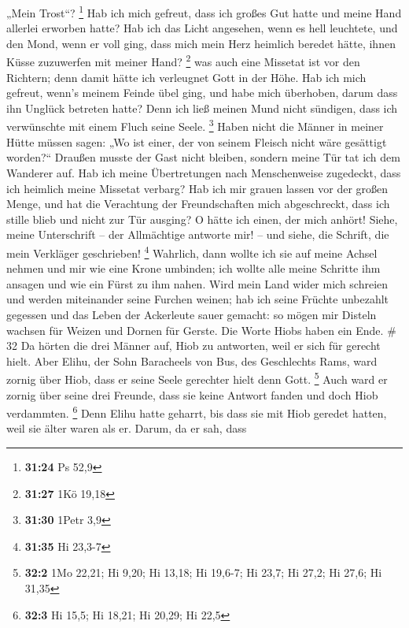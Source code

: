 „Mein Trost``? \footnote{\textbf{31:24} Ps 52,9}  Hab ich
mich gefreut, dass ich großes Gut hatte und meine Hand allerlei erworben
hatte?  Hab ich das Licht angesehen, wenn es hell
leuchtete, und den Mond, wenn er voll ging,  dass mich mein
Herz heimlich beredet hätte, ihnen Küsse zuzuwerfen mit meiner Hand?
\footnote{\textbf{31:27} 1Kö 19,18}  was auch eine Missetat
ist vor den Richtern; denn damit hätte ich verleugnet Gott in der Höhe.
 Hab ich mich gefreut, wenn's meinem Feinde übel ging, und
habe mich überhoben, darum dass ihn Unglück betreten hatte?
 Denn ich ließ meinen Mund nicht sündigen, dass ich
verwünschte mit einem Fluch seine Seele. \footnote{\textbf{31:30} 1Petr
  3,9}  Haben nicht die Männer in meiner Hütte müssen
sagen: „Wo ist einer, der von seinem Fleisch nicht wäre gesättigt
worden?{}``  Draußen musste der Gast nicht bleiben, sondern
meine Tür tat ich dem Wanderer auf.  Hab ich meine
Übertretungen nach Menschenweise zugedeckt, dass ich heimlich meine
Missetat verbarg?  Hab ich mir grauen lassen vor der großen
Menge, und hat die Verachtung der Freundschaften mich abgeschreckt, dass
ich stille blieb und nicht zur Tür ausging?  O hätte ich
einen, der mich anhört! Siehe, meine Unterschrift -- der Allmächtige
antworte mir! -- und siehe, die Schrift, die mein Verkläger geschrieben!
\footnote{\textbf{31:35} Hi 23,3-7}  Wahrlich, dann wollte
ich sie auf meine Achsel nehmen und mir wie eine Krone umbinden;
 ich wollte alle meine Schritte ihm ansagen und wie ein
Fürst zu ihm nahen.  Wird mein Land wider mich schreien und
werden miteinander seine Furchen weinen;  hab ich seine
Früchte unbezahlt gegessen und das Leben der Ackerleute sauer gemacht:
 so mögen mir Disteln wachsen für Weizen und Dornen für
Gerste. Die Worte Hiobs haben ein Ende. \# 32  Da hörten die
drei Männer auf, Hiob zu antworten, weil er sich für gerecht hielt.
 Aber Elihu, der Sohn Baracheels von Bus, des Geschlechts
Rams, ward zornig über Hiob, dass er seine Seele gerechter hielt denn
Gott. \footnote{\textbf{32:2} 1Mo 22,21; Hi 9,20; Hi 13,18; Hi 19,6-7;
  Hi 23,7; Hi 27,2; Hi 27,6; Hi 31,35}  Auch ward er zornig
über seine drei Freunde, dass sie keine Antwort fanden und doch Hiob
verdammten. \footnote{\textbf{32:3} Hi 15,5; Hi 18,21; Hi 20,29; Hi 22,5}
 Denn Elihu hatte geharrt, bis dass sie mit Hiob geredet
hatten, weil sie älter waren als er.  Darum, da er sah, dass
